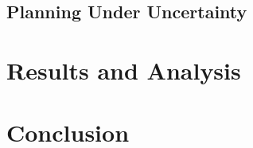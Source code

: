 \documentclass[10pt,conference]{ieeeconf}
\begin{document}
\subsection{Planning Under Uncertainty}

\section{Results and Analysis}\label{sec:analysis}

\section{Conclusion}\label{sec:conclusion}



\end{document}
